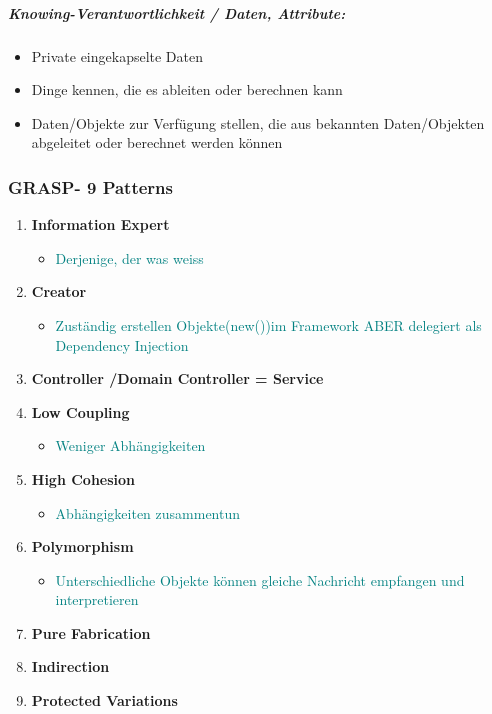 \documentclass[../ZF_SWEN1.tex]{subfiles}
\begin{document}
\subparagraph{\textcolor {BrickRed}{\textbf{Knowing-Verantwortlichkeit / Daten, Attribute: }}}
\begin{itemize}
	\item Private eingekapselte Daten
	\item Dinge kennen, die es ableiten oder berechnen kann
	\item Daten/Objekte zur Verfügung stellen, die aus bekannten Daten/Objekten abgeleitet oder berechnet werden können
\end{itemize}









\subsubsection{GRASP- 9 Patterns}
\begin{enumerate}
	\item \textbf{Information Expert}
	\begin{itemize}
		\item \textcolor {teal} {Derjenige, der was weiss}
	\end{itemize}
	\item \textbf{Creator}
		\begin{itemize}
		\item \textcolor {teal} {Zuständig erstellen Objekte(new())im Framework ABER delegiert als Dependency Injection}
	\end{itemize}
	\item \textbf{Controller /Domain Controller = Service}
	\item \textbf{Low Coupling}
		\begin{itemize}
		\item \textcolor {teal} {Weniger Abhängigkeiten}
	\end{itemize}
	\item \textbf{High Cohesion}
		\begin{itemize}
		\item \textcolor {teal} {Abhängigkeiten zusammentun}
	\end{itemize}
	\item \textbf{Polymorphism}
		\begin{itemize}
		\item \textcolor {teal} {Unterschiedliche Objekte können gleiche Nachricht empfangen und interpretieren}
	\end{itemize}
	\item \textbf{Pure Fabrication}
	\item \textbf{Indirection}
	\item \textbf{Protected Variations}
\end{enumerate}
\end{document}
